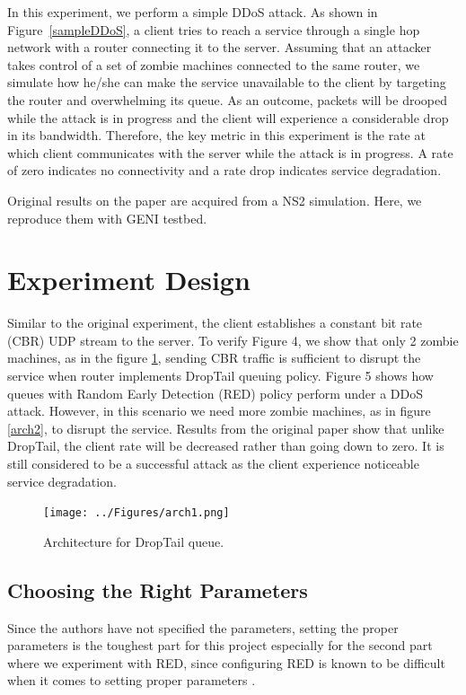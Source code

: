 \documentclass[12pt,twocolumn]{article}
\begin{document}
In this experiment, we perform a simple DDoS attack.
As shown in Figure~\ref{sampleDDoS}, a client tries to reach a service through a single hop network with a router connecting it to the server.
Assuming that an attacker takes control of a set of zombie machines connected to the same router, we simulate how he/she can make the service unavailable to the client by targeting the router and overwhelming its queue.
As an outcome, packets will be drooped while the attack is in progress and the client will experience a considerable drop in its bandwidth.
Therefore, the key metric in this experiment is the rate at which client communicates with the server while the attack is in progress.
A rate of zero indicates no connectivity and a rate drop indicates service degradation.

Original results on the paper are acquired from a NS2 simulation.
Here, we reproduce them with GENI testbed.

\section {Experiment Design}

Similar to the original experiment, the client establishes a constant bit rate (CBR) UDP stream to the server.
To verify Figure 4, we show that only 2 zombie machines, as in the figure \ref{arch1}, sending CBR traffic is sufficient to disrupt the service when router implements DropTail queuing policy.
Figure 5 shows how queues with Random Early Detection (RED) policy perform under a DDoS attack.
However, in this scenario we need more zombie machines, as in figure \ref{arch2}, to disrupt the service.
Results from the original paper show that unlike DropTail, the client rate will be decreased rather than going down to zero.
It is still considered to be a successful attack as the client experience noticeable service degradation.

\begin{figure}[b]
    \centering
    \texttt{[image: ../Figures/arch1.png]} \caption{Architecture for DropTail queue.} \label{arch1}
\end{figure}

\subsection{Choosing the Right Parameters}

Since the authors have not specified the parameters, setting the proper parameters is the toughest part for this project especially for the second part where we experiment with RED, since configuring RED is known to be difficult when it comes to setting proper parameters \cite{floyd1993random}.
\end{document}
